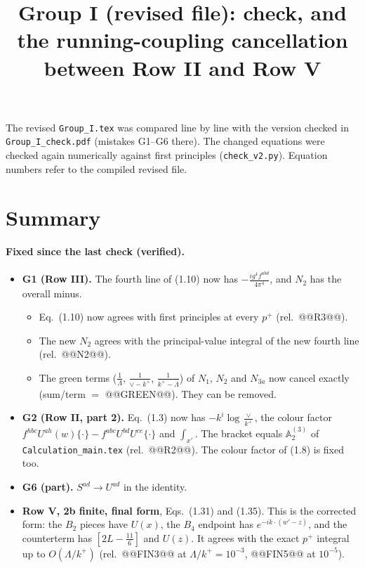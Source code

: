 \documentclass[10pt]{article}
\title{Group I (revised file): check, and the running-coupling cancellation between Row II and Row V}
\date{}
\numberwithin{equation}{section}
\def\mf#1{\mathbb{#1}}
\begin{document}
\maketitle
\noindent The revised \texttt{Group\_I.tex} was compared line by line with the version checked in \texttt{Group\_I\_check.pdf} (mistakes G1--G6 there). The changed equations were checked again numerically against first principles (\texttt{check\_v2.py}). Equation numbers refer to the compiled revised file.

\section{Summary}
\paragraph{Fixed since the last check (verified).}
\begin{itemize}
\item \textbf{G1 (Row III).} The fourth line of (1.10) now has $-\frac{ig^4f^{abd}}{4\pi^4}$, and $N_2$ has the overall minus.
\begin{itemize}
\item Eq.~(1.10) now agrees with first principles at every $p^+$ (rel.\ @@R3@@).
\item The new $N_2$ agrees with the principal-value integral of the new fourth line (rel.\ @@N2@@).
\item The green terms ($\frac1\Lambda$, $\frac1{\vee-k^+}$, $\frac1{k^+-\Lambda}$) of $N_1$, $N_2$ and $N_{3a}$ now cancel exactly (sum/term $=$ @@GREEN@@). They can be removed.
\end{itemize}
\item \textbf{G2 (Row II, part 2).} Eq.~(1.3) now has $-k^i\log\frac{\vee}{k^+}$, the colour factor $f^{hbc}U^{ah}(w)\{\cdot\}-f^{abc}U^{bd}U^{ce}\{\cdot\}$ and $\int_{x'}$. The bracket equals $\mf A^{(3)}_2$ of \texttt{Calculation\_main.tex} (rel.\ @@R2@@). The colour factor of (1.8) is fixed too.
\item \textbf{G6 (part).} $S^{ad}\to U^{ad}$ in the identity.
\item \textbf{Row V, 2b finite, final form}, Eqs.~(1.31) and (1.35). This is the corrected form: the $B_2$ pieces have $U(x)$, the $B_4$ endpoint has $e^{-ik\cdot(w'-z)}$, and the counterterm has $[2L-\frac{11}{6}]$ and $U(z)$. It agrees with the exact $p^+$ integral up to $O(\Lambda/k^+)$ (rel.\ @@FIN3@@ at $\Lambda/k^+=10^{-3}$, @@FIN5@@ at $10^{-5}$).
\end{itemize}
\end{document}
